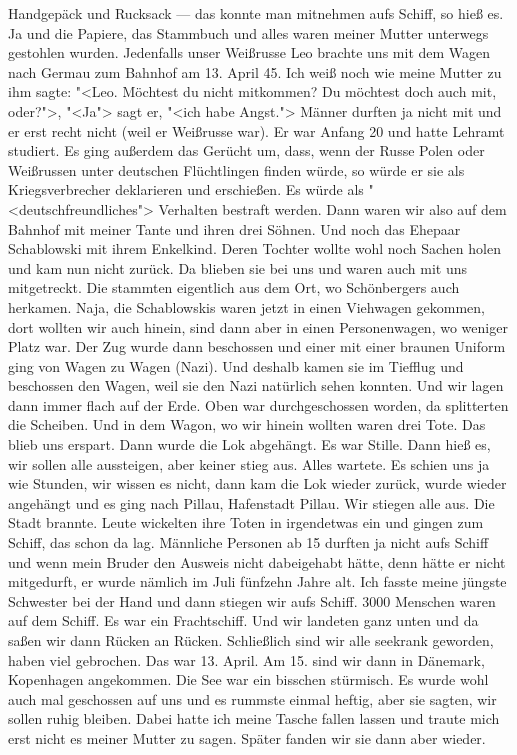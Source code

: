 \documentclass[12pt, twoside]{book}
\begin{document}
Handgepäck und Rucksack --- das konnte man mitnehmen aufs Schiff, so hieß es. Ja und die Papiere, das Stammbuch und alles waren meiner Mutter unterwegs gestohlen wurden. Jedenfalls unser Weißrusse Leo
brachte uns mit dem Wagen nach Germau zum Bahnhof am 13. April 45. Ich weiß noch wie meine Mutter zu ihm sagte: "<Leo. Möchtest du nicht mitkommen? Du möchtest doch auch mit, oder?">, "<Ja"> sagt er, "<ich habe Angst."> Männer durften ja nicht mit und er
erst recht nicht (weil er Weißrusse war). Er war Anfang 20 und hatte Lehramt studiert.
Es ging außerdem das Gerücht um, dass, wenn der Russe Polen oder Weißrussen unter deutschen Flüchtlingen finden würde, so würde er sie als Kriegsverbrecher deklarieren und erschießen. Es würde als "<deutschfreundliches"> Verhalten
bestraft werden.
Dann waren wir also auf dem Bahnhof mit meiner Tante und ihren drei Söhnen. Und noch das Ehepaar Schablowski mit ihrem Enkelkind. Deren Tochter wollte wohl noch Sachen holen und kam nun nicht zurück.
Da blieben sie bei uns und waren auch mit uns mitgetreckt. Die stammten eigentlich aus dem Ort, wo Schönbergers auch herkamen.
Naja, die Schablowskis waren jetzt in einen Viehwagen gekommen, dort wollten wir auch hinein, sind dann aber in einen Personenwagen, wo weniger Platz war. Der Zug wurde dann beschossen und einer mit einer
braunen Uniform ging von Wagen zu Wagen (Nazi). Und deshalb kamen sie im Tiefflug und beschossen den Wagen, weil sie den Nazi natürlich sehen konnten.
Und wir lagen dann immer flach auf der Erde. Oben war durchgeschossen worden, da splitterten die Scheiben. Und in dem Wagon, wo wir hinein wollten waren drei Tote. Das blieb uns erspart.
Dann wurde die Lok abgehängt. Es war Stille. Dann hieß es, wir sollen alle aussteigen, aber keiner stieg aus. Alles wartete. Es schien uns ja wie Stunden, wir wissen es nicht, dann kam die Lok wieder zurück, wurde wieder angehängt und es 
ging nach Pillau, Hafenstadt Pillau.
Wir stiegen alle aus. Die Stadt brannte. Leute wickelten ihre Toten in irgendetwas ein und gingen zum Schiff, das schon da lag. Männliche Personen ab 15 durften ja nicht aufs Schiff und wenn mein Bruder den Ausweis nicht dabeigehabt
hätte, denn hätte er nicht mitgedurft, er wurde nämlich im Juli fünfzehn Jahre alt. Ich fasste meine jüngste Schwester bei der Hand und dann stiegen wir aufs Schiff. 3000 Menschen waren auf dem Schiff. Es war ein Frachtschiff.
Und wir landeten ganz unten und da saßen wir dann Rücken an Rücken. Schließlich sind wir alle seekrank geworden, haben viel gebrochen. Das war 13. April. Am 15. sind wir dann in Dänemark, Kopenhagen angekommen.
Die See war ein bisschen stürmisch. Es wurde wohl auch mal geschossen auf uns und es rummste einmal heftig, aber sie sagten, wir sollen ruhig bleiben. Dabei hatte ich meine Tasche fallen lassen und traute mich
erst nicht es meiner Mutter zu sagen. Später fanden wir sie dann aber wieder.
\end{document}
